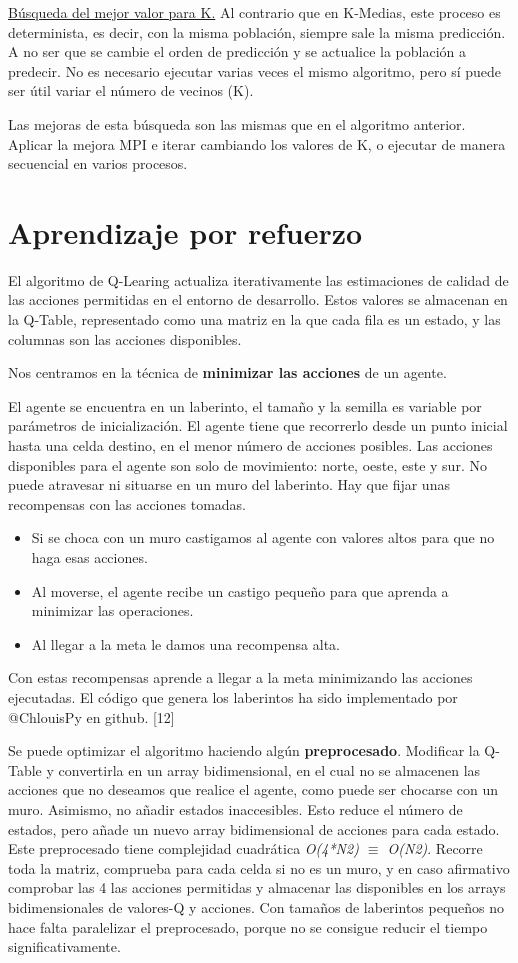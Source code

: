 		\underline{Búsqueda del mejor valor para K.}
		Al contrario que en K-Medias, este proceso es determinista, es decir, con la misma población, siempre sale la misma predicción. A no ser que se cambie el orden de predicción y se actualice la población a predecir. No es necesario ejecutar varias veces el mismo algoritmo, pero sí puede ser útil variar el número de vecinos (K).
		
		Las mejoras de esta búsqueda son las mismas que en el algoritmo anterior. Aplicar la mejora MPI e iterar cambiando los valores de K, o ejecutar de manera secuencial en varios procesos.


\section{Aprendizaje por refuerzo}
	El algoritmo de Q-Learing actualiza iterativamente las estimaciones de calidad de las acciones permitidas en el entorno de desarrollo. Estos valores se almacenan en la Q-Table, representado como una matriz en la que cada fila es un estado, y las columnas son las acciones disponibles.
	
	Nos centramos en la técnica de \textbf{minimizar las acciones} de un agente. 
	
	El agente se encuentra en un laberinto, el tamaño y la semilla es variable por parámetros de inicialización. El agente tiene que recorrerlo desde un punto inicial hasta una celda destino, en el menor número de acciones posibles. Las acciones disponibles para el agente son solo de movimiento: norte, oeste, este y sur. No puede atravesar ni situarse en un muro del laberinto. Hay que fijar unas recompensas con las acciones tomadas. 	
	\begin{itemize}
		\item Si se choca con un muro castigamos al agente con valores altos para que no haga esas acciones.
		\item Al moverse, el agente recibe un castigo pequeño para que aprenda a minimizar las operaciones.
		\item Al llegar a la meta le damos una recompensa alta. 		
	\end{itemize}
	
	Con estas recompensas aprende a llegar a la meta minimizando las acciones ejecutadas.
	El código que genera los laberintos ha sido implementado por @ChlouisPy en github. [12]
	
	Se puede optimizar el algoritmo haciendo algún \textbf{preprocesado}.
	Modificar la Q-Table y convertirla en un array bidimensional, en el cual no se almacenen las acciones que no deseamos que realice el agente, como puede ser chocarse con un muro. Asimismo, no añadir estados inaccesibles. Esto reduce el número de estados, pero añade un nuevo array bidimensional de acciones para cada estado. Este preprocesado tiene complejidad cuadrática \textit{O(4*N2) $\equiv$ O(N2)}. Recorre toda la matriz, comprueba para cada celda si no es un muro, y en caso afirmativo comprobar las 4 las acciones permitidas y almacenar las disponibles en los arrays bidimensionales  de valores-Q y acciones. Con tamaños de laberintos pequeños no hace falta paralelizar el preprocesado, porque no se consigue reducir el tiempo significativamente.
	
